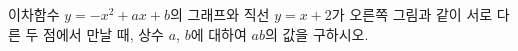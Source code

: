 \noindent\begin{minipage}[t]{0.58\linewidth}\vspace{0pt}\raggedright 이차함수 $y=-x^2+ax+b$의 그래프와 직선 $y=x+2$가 오른쪽 그림과 같이 서로 다른 두 점에서 만날 때, 상수 $a$, $b$에 대하여 $ab$의 값을 구하시오.\end{minipage}\hfill\begin{minipage}[t]{0.4\linewidth}\vspace{0pt}\centering \resizebox{\ifdim\width>\linewidth\linewidth\else\width\fi}{!}{}\end{minipage}\par
